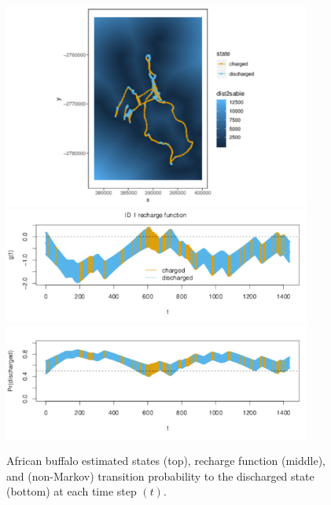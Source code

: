 \documentclass[12pt]{article}\usepackage[]{graphicx}\usepackage[]{xcolor}
\begin{document}
\begin{figure}[htbp]
  \centering
  \includegraphics[width=0.9\textwidth]{plot_buffaloStates.pdf}\\
  \includegraphics[width=0.9\textwidth]{plot_buffaloExample011.pdf}\\
  \includegraphics[width=0.9\textwidth]{plot_buffaloResults.pdf}\\
  \caption{African buffalo estimated states (top), recharge function (middle), and (non-Markov) transition probability to the discharged state (bottom) at each time step $(t)$.}
  \label{fig:recharge}
\end{figure}
\end{document}
